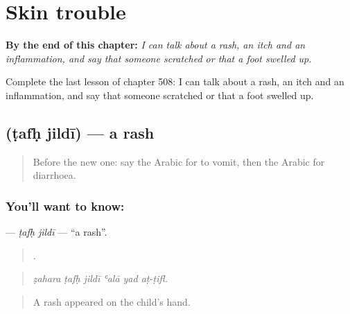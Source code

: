 
\chapter{Skin trouble}
\label{ch:ar-skin-trouble}

\begin{chapteropening}
\textbf{By the end of this chapter:} \emph{I can talk about a rash, an itch and an inflammation, and say that someone scratched or that a foot swelled up.}

Complete the last lesson of chapter 508: I can talk about a rash, an itch and an inflammation, and say that someone scratched or that a foot swelled up.
\end{chapteropening}

\section[\texorpdfstring{\ar{طفح} \ar{جلدي} (ṭafḥ jildī)}{طفح جلدي (ṭafḥ jildī)}]{  (ṭafḥ jildī) — a rash}

\label{lesson:AR-C508-tafh-jildi}



\begin{quote}
Before the new one: say the Arabic for to vomit, then the Arabic for diarrhoea.
\end{quote}

\subsection*{You'll want to know:  }
\textbf{ } — \emph{ṭafḥ jildī} — \textquotedblleft{}a rash\textquotedblright{}.

\begin{quote}
     .
\end{quote}

\begin{quote}
\emph{ẓahara ṭafḥ jildī ʿalā yad aṭ-ṭifl.}
\end{quote}

\begin{quote}
A rash appeared on the child's hand.
\end{quote}

